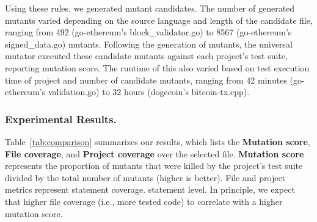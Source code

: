 Using these rules, we generated mutant candidates. The number of generated mutants varied depending
on the source language and length of the candidate file, ranging from 492 (go-ethereum's block\_validator.go) to 
8567 (go-ethereum's signed\_data.go) mutants. Following the generation of mutants, the universal mutator
executed these candidate mutants against each project's test suite, reporting mutation score. The runtime
of this also varied based on test execution time of project and number of candidate mutants, ranging from
42 minutes (go-ethereum's validation.go) to 32 hours (dogecoin's bitcoin-tx.cpp).

\subsubsection*{Experimental Results.}


Table~\ref{tab:comparison} summarizes our results, which lists the
\textbf{Mutation score}, \textbf{File coverage}, and \textbf{Project coverage}
over the selected file. \textbf{Mutation score} represents the proportion of
mutants that were killed by the project's test suite divided by the total number
of mutants (higher is better). File and project metrics represent statement
coverage. statement level. In principle, we expect that higher file coverage
(i.e., more tested code) to correlate with a higher mutation score.


